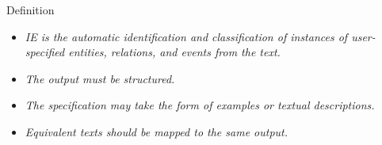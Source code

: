 \documentclass[
    11pt,
    notheorems,
    xcolor={dvipsnames},
    hyperref={
        pdfstartview=FitH, 
        pdftitle={Ikasketa-adibide urriko Informazio-Erauzketa}, 
        pdfauthor={Oscar Sainz Jimenez}, 
        citecolor=secondary, 
    }
]{beamer}
\begin{document}
\begin{frame}

    \begin{block}{Definition~\citep{Grishman_2019}}
        \begin{itemize}[<+->]
            \item \textit{IE is the automatic identification and classification of instances of user-specified entities, relations, and events from the text.}
            \item \textit{The output must be structured.}
            \item \textit{The specification may take the form of examples or textual descriptions.}
            \item \textit{Equivalent texts should be mapped to the same output.}
        \end{itemize}
    \end{block}

\end{frame}
\end{document}
